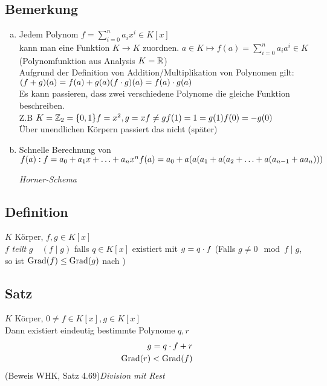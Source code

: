 \subsection{Bemerkung}\label{sec:1.25}
\begin{enumerate}[a)]
\item Jedem Polynom $f = \sum\limits_{i = 0}^{n} a_ix^i \in K[x]$\\
kann man eine Funktion $K \to K$ zuordnen. $a \in K \longmapsto f(a) = \sum\limits_{i=0}^{n} a_ia^i \in K$ \\(Polynomfunktion aus Analysis $K = \mathbb{R}$)\\
Aufgrund der Definition von Addition/Multiplikation von Polynomen gilt:\\
$(f+g)(a) = f(a)+ g(a)\\
(f \cdot g)(a) = f(a) \cdot g(a)$\\
Es kann passieren, dass zwei verschiedene Polynome die gleiche Funktion beschreiben.\\
Z.B $K = \mathbb{Z}_2 = \{0,1\}\\
f = x^2, g =x\\
f \ne g\\
f(1) = 1 = g(1)\\
f(0) = - g(0)$\\
Über unendlichen Körpern passiert das nicht (später)
\item Schnelle Berechnung von $f(a):\\
f = a_0 + a_1x + \ldots + a_nx^n\\
f(a) = a_0 + a (a (a_1 + a(a_2 + \ldots + a(a_{n-1} + aa_n)))$
{\begin{center}\large\em Horner-Schema\end{center}}
\end{enumerate}
\subsection{Definition}\label{sec:1.26}
$K$ Körper, $f,g \in K[x]$\\
$f$ \emph{teilt} $g\quad (f\mid g)$ falls $q \in K[x]$ existiert mit $g = q \cdot f$ (Falls $g \ne 0 \mod f \mid g$, so ist $\operatorname{Grad}(f) \leq \operatorname{Grad}(g)$ nach )
\subsection{Satz}\label{sec:1.27}
$K$ Körper, $0 \ne f \in K[x], g \in K[x]$\\
Dann existiert eindeutig bestimmte Polynome $q,r$
\begin{align}
g = q \cdot f + r\\
\operatorname{Grad}(r) < \operatorname{Grad}(f)
\end{align}
(Beweis WHK, Satz 4.69)\hfill\emph{Division mit Rest}
